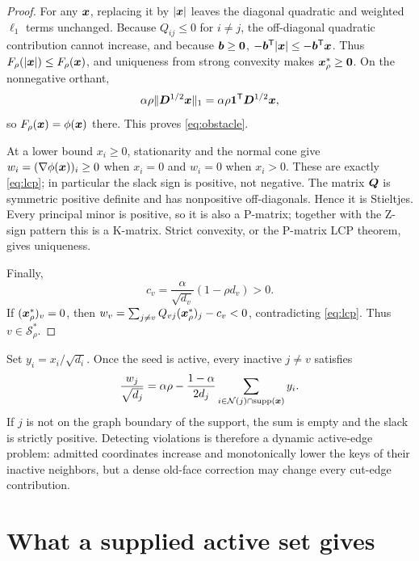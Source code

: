 \begin{proof}
For any $\bm{x}$, replacing it by $|\bm{x}|$ leaves the diagonal quadratic and
weighted $\ell_1$ terms unchanged.  Because $Q_{ij}\leq0$ for $i\neq j$,
the off-diagonal quadratic contribution cannot increase, and because
$\bm{b}\geq\bm{0}$, $-\bm{b}^{\mathsf{T}}|\bm{x}|\leq-\bm{b}^{\mathsf{T}}\bm{x}$.  Thus
$F_\rho(|\bm{x}|)\leq F_\rho(\bm{x})$, and uniqueness from strong convexity makes
$\bm{x}_\rho^*\geq\bm{0}$.  On the nonnegative orthant,
\[
 \alpha\rho\lVert\bm{D}^{1/2}\bm{x}\rVert_1
 =\alpha\rho\mathbf{1}^{\mathsf{T}}\bm{D}^{1/2}\bm{x},
\]
so $F_\rho(\bm{x})=\phi(\bm{x})$ there.  This proves \cref{eq:obstacle}.

At a lower bound $x_i\geq0$, stationarity and the normal cone give
$w_i=(\nabla\phi(\bm{x}))_i\geq0$ when $x_i=0$ and $w_i=0$ when $x_i>0$.
These are exactly \cref{eq:lcp}; in particular the slack sign is positive,
not negative.  The matrix $\bm{Q}$ is symmetric positive definite and has
nonpositive off-diagonals.  Hence it is Stieltjes.  Every principal minor is
positive, so it is also a P-matrix; together with the Z-sign pattern this is a
K-matrix.  Strict convexity, or the P-matrix LCP theorem, gives uniqueness.

Finally,
\[
 c_v=\frac{\alpha}{\sqrt{d_v}}(1-\rho d_v)>0.
\]
If $(\bm{x}_\rho^*)_v=0$, then
$w_v=\sum_{j\neq v}Q_{vj}(\bm{x}_\rho^*)_j-c_v<0$, contradicting
\cref{eq:lcp}.  Thus $v\in\mathcal S_\rho^*$.
\end{proof}

\begin{remark}
\label{rem:boundary-key}
Set $y_i=x_i/\sqrt{d_i}$.  Once the seed is active, every inactive
$j\neq v$ satisfies
\begin{equation}
 \frac{w_j}{\sqrt{d_j}}
 =\alpha\rho-\frac{1-\alpha}{2d_j}
   \sum_{i\in\mathcal N(j)\cap\operatorname{supp}(\bm{x})}y_i.
 \label{eq:boundary-key}
\end{equation}
If $j$ is not on the graph boundary of the support, the sum is empty and the
slack is strictly positive.  Detecting violations is therefore a dynamic
active-edge problem: admitted coordinates increase and monotonically lower
the keys of their inactive neighbors, but a dense old-face correction may
change every cut-edge contribution.
\end{remark}

\section{What a supplied active set gives}
\label{sec:supplied}

